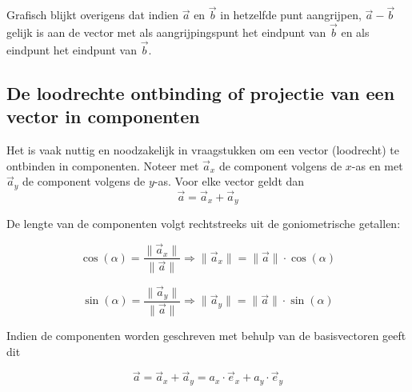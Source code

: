 \documentclass{ximera}
\begin{document}
Grafisch blijkt overigens dat indien \(\vec{a}\) en \(\vec{b}\) in hetzelfde punt aangrijpen, \(\vec{a} - \vec{b}\) gelijk is aan de vector met als aangrijpingspunt het eindpunt van \(\vec{b}\) en als eindpunt het eindpunt van \(\vec{b}\).

\subsection*{De loodrechte ontbinding of projectie van een vector in componenten}



Het is vaak nuttig en noodzakelijk in vraagstukken om een vector (loodrecht) te ontbinden in componenten. 
Noteer met \(\vec{a}_x\) de component volgens de \(x\)-as en met \(\vec{a}_y\) de component volgens de \(y\)-as. 
Voor elke vector geldt dan 
\[
\vec{a} = \vec{a}_x + \vec{a}_y
\]

De lengte van de componenten volgt rechtstreeks uit de goniometrische getallen: 

\[
\cos(\alpha) = \frac{\| \vec{a}_x \|}{\| \vec{a} \|} \Rightarrow \| \vec{a}_x \| = \|\vec{a}\| \cdot \cos(\alpha)
\]

\[
\sin(\alpha) = \frac{\| \vec{a}_y \|}{\| \vec{a} \|} \Rightarrow \| \vec{a}_y \| = \|\vec{a}\| \cdot \sin(\alpha)
\]


Indien de componenten worden geschreven met behulp van de basisvectoren geeft dit 

\[
\vec{a} = \vec{a}_x + \vec{a}_y = a_x \cdot \vec{e}_x + a_y \cdot \vec{e}_y 
\]
\end{document}
